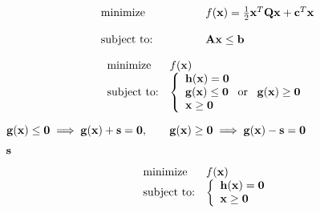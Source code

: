 \documentclass{article}
\def\lthtmlcheckvsize{\ifdim\ht\sizebox<\vsize 
  \ifdim\wd\sizebox<\hsize\expandafter\hfill\fi \expandafter\vfill
  \else\expandafter\vss\fi}%
\begin{document}
{\newpage\clearpage
{}%
\begin{displaymath}\begin{array}{ll}
\mbox{minimize}    &
f({\bf x})=\frac{1}{2}{\bf x}^T{\bf Q}{\bf x}+{\bf c}^T{\bf x}\\
\;\;\;\;\;\;\;\;\;\;\;\;\;\;\;\;\;\;\;\;\;\;\;\;\;\;\;\;\;\;\\
\mbox{subject to:} & {\bf Ax}\le{\bf b}
\end{array}\end{displaymath}%
\lthtmldisplayZ
\lthtmlcheckvsize\clearpage}

{\newpage\clearpage
{}%
\begin{displaymath}\begin{array}{ll}
\mbox{minimize} & f({\bf x}) \\
\mbox{subject to:} &
\left\{ \begin{array}{l}
{\bf h}({\bf x})={\bf0}\\
{\bf g}({\bf x})\le{\bf0}\;\;\;\mbox{or}\;\;\;
{\bf g}({\bf x})\ge{\bf0}\\
{\bf x}\ge{\bf0}
\end{array}\right.\end{array}\end{displaymath}%
\lthtmldisplayZ
\lthtmlcheckvsize\clearpage}

{\newpage\clearpage
{}%
$\displaystyle {\bf g}({\bf x})\le{\bf0}\;\Longrightarrow \;
{\bf g}({\bf x})+{\bf s}={\bf0},\;\;\;\;\;\;\;
{\bf g}({\bf x})\ge{\bf0}\;\Longrightarrow \;
{\bf g}({\bf x})-{\bf s}={\bf0}$%
\lthtmlindisplaymathZ
\lthtmlcheckvsize\clearpage}

{\newpage\clearpage
{}%
$ {\bf s}$%
\lthtmlindisplaymathZ
\lthtmlcheckvsize\clearpage}

{\newpage\clearpage
{}%
\begin{displaymath}\begin{array}{ll}
\mbox{minimize} & f({\bf x}) \\
\mbox{subject to:} &
\left\{\begin{array}{l}
{\bf h}({\bf x})={\bf0}\\
{\bf x}\ge{\bf0}
\end{array}\right.\end{array}\end{displaymath}%
\lthtmldisplayZ
\lthtmlcheckvsize\clearpage}
\end{document}
